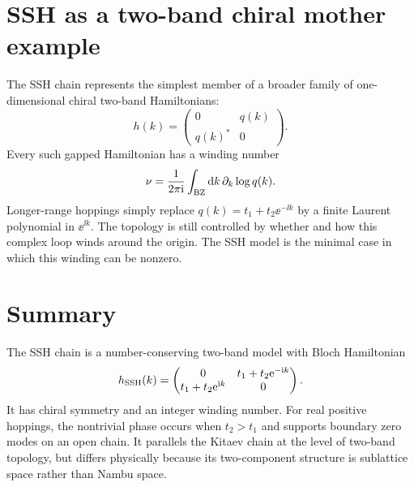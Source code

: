 \section{SSH as a two-band chiral mother example}
\label{sec:ssh-two-band-chiral-mother}

The SSH chain represents the simplest member of a broader family of one-dimensional chiral two-band Hamiltonians:
\begin{equation}
\label{eq:ssh-general-chiral-two-band}
    h(k)=
    \begin{pmatrix}
        0&q(k)\\ q(k)^*&0
    \end{pmatrix}.
\end{equation}
Every such gapped Hamiltonian has a winding number
\begin{equation}
\label{eq:ssh-general-winding}
    \nu
    =
    \frac{1}{2\pi\mathrm{i}}\int_{\rm BZ}\mathrm{d} k\,
    \partial_k\log q(k).
\end{equation}
Longer-range hoppings simply replace $q(k)=t_1+t_2\ee^{-\ii k}$ by a finite
Laurent polynomial in $\ee^{\ii k}$.  The topology is still controlled by whether
and how this complex loop winds around the origin.  The SSH model is the minimal
case in which this winding can be nonzero.

\section{Summary}
\label{sec:ssh-summary}

The SSH chain is a number-conserving two-band model with Bloch Hamiltonian
\begin{equation}
    h_{\rm SSH}(k)=
    \begin{pmatrix}
        0&t_1+t_2\mathrm{e}^{-\mathrm{i} k}\\
        t_1+t_2\mathrm{e}^{\mathrm{i} k}&0
    \end{pmatrix}.
\end{equation}
It has chiral symmetry and an integer winding number.  For real positive
hoppings, the nontrivial phase occurs when $t_2>t_1$ and supports boundary zero
modes on an open chain.  It parallels the Kitaev chain at the level of two-band
topology, but differs physically because its two-component structure is
sublattice space rather than Nambu space.
